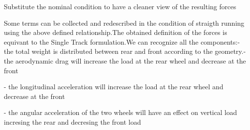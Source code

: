 \documentclass{article}
\begin{document}
\begin{maplegroup}
\begin{Maple Normal}{
Substitute the nominal condition to have a cleaner view of the resulting forces}\end{Maple Normal}

\end{maplegroup}
\begin{maplegroup}
\begin{mapleinput}
\end{mapleinput}
\mapleresult
\begin{maplelatex}
\end{maplelatex}
\end{maplegroup}
\begin{maplegroup}
\begin{mapleinput}
\end{mapleinput}
\end{maplegroup}
\begin{maplegroup}
\begin{mapleinput}
\end{mapleinput}
\end{maplegroup}
\begin{maplegroup}
\begin{Maple Normal}{
Some terms can be collected and redescribed in the condition of straigth running using the above defined relationship.The obtained definition of the forces is equivant to the Single Track formulation.We can recognize all the components:- the total weight is distributed between rear and front according to the geometry.- the aerodynamic drag will increase the load at the rear wheel and decrease at the front}\end{Maple Normal}

\begin{Maple Normal}{
- the longitudinal acceleration will increase the load at the rear wheel and decrease at the front}\end{Maple Normal}

\begin{Maple Normal}{
- the angular acceleration of the two wheels will have an effect on vertical load incresing the rear and decresing the front load}\end{Maple Normal}
\end{maplegroup}
\end{document}
